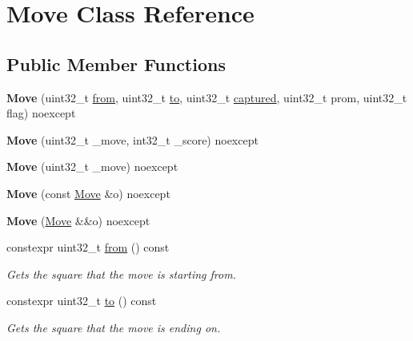 \hypertarget{classMove}{}\section{Move Class Reference}
\label{classMove}
\subsection*{Public Member Functions}
\begin{DoxyCompactItemize}
\item 
\mbox{\label{classMove_ac63ab436cc90ca3b83f6bf9328745410}} 
{\bfseries Move} (uint32\+\_\+t \mbox{\hyperlink{classMove_a5a16b2160e1cb66cde53dd6251616243}{from}}, uint32\+\_\+t \mbox{\hyperlink{classMove_a14f68402d1ad19b441730a7f7d703362}{to}}, uint32\+\_\+t \mbox{\hyperlink{classMove_a5a8811a7e6ee7fe36675d49038f2ea2b}{captured}}, uint32\+\_\+t prom, uint32\+\_\+t flag) noexcept
\item 
\mbox{\label{classMove_a880d0197342959b353fd6de7d0cae16f}} 
{\bfseries Move} (uint32\+\_\+t \+\_\+move, int32\+\_\+t \+\_\+score) noexcept
\item 
\mbox{\label{classMove_a023d4469f67a68d9d39ce24b95031ab8}} 
{\bfseries Move} (uint32\+\_\+t \+\_\+move) noexcept
\item 
\mbox{\label{classMove_a29a98334b21446eba8df130c2521b13f}} 
{\bfseries Move} (const \mbox{\hyperlink{classMove}{Move}} \&o) noexcept
\item 
\mbox{\label{classMove_a84c4266bc47d32d7c07a72f76c2d2e46}} 
{\bfseries Move} (\mbox{\hyperlink{classMove}{Move}} \&\&o) noexcept
\item 
constexpr uint32\+\_\+t \mbox{\hyperlink{classMove_a5a16b2160e1cb66cde53dd6251616243}{from}} () const
\begin{DoxyCompactList}\small\item\em Gets the square that the move is starting from. \end{DoxyCompactList}\item 
constexpr uint32\+\_\+t \mbox{\hyperlink{classMove_a14f68402d1ad19b441730a7f7d703362}{to}} () const
\begin{DoxyCompactList}\small\item\em Gets the square that the move is ending on. \end{DoxyCompactList}\item 

\end{DoxyCompactItemize}
